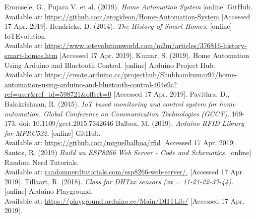 \documentclass[journal,onecolumn]{IEEEtran}
\begin{document}
%
%
%
\begin{flushleft}
\begin{thebibliography}{1}
Eromsele, G., Pujara V. et al. (2019). \textit{Home Automation System} [online] GitHub. \\ Available at: \url{https://github.com/erogideon/Home-Automation-System} [Accessed 17 Apr. 2019].
Hendricks, D. (2014). \textit{The History of Smart Homes.} [online] IoTEvolution. \\ Available at: \url{https://www.iotevolutionworld.com/m2m/articles/376816-history-smart-homes.htm} [Accessed 17 Apr. 2019].
Kumar, S. (2019). Home Automation Using Arduino and Bluetooth Control. [online] Arduino Project Hub. \\ Available at: \url{https://create.arduino.cc/projecthub/Shubhamkumar97/home-automation-using-arduino-and-bluetooth-control-404e9c?ref=user\&ref\_id=598721\&offset=0} [Accessed 17 Apr. 2019].
Pavithra, D., Balakrishnan, R. (2015). \textit{IoT based monitoring and control system for home automation. Global Conference on Communication Technologies (GCCT)}. 169-173. doi: 10.1109/gcct.2015.7342646
Balboa, M. (2019). \textit{Arduino RFID Library for MFRC522.} [online] GitHub. \\ Available at:  \url{https://github.com/miguelbalboa/rfid} [Accessed 17 Apr. 2019].
Santos, R. (2019) \textit{Build an ESP8266 Web Server - Code and Schematics.} [online] Random Nerd Tutorials. \\ Available at: \url{randomnerdtutorials.com/esp8266-web-server/.} [Accessed 17 Apr. 2019].
Tillaart, R. (2018). \textit{Class for DHTxx sensors (xx = 11-21-22-33-44).} [online] Arduino Playground. \\ Available at: \url{https://playground.arduino.cc/Main/DHTLib/} [Accessed 17 Apr. 2019].


\end{thebibliography}
\end{flushleft}

\end{document}
